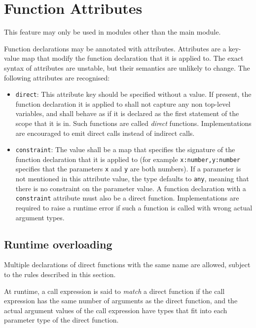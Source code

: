 \section{Function Attributes}

This feature may only be used in modules other than the main module.

Function declarations may be annotated with attributes.  Attributes are a key-value map that modify the function declaration that it is applied to.  The exact syntax of attributes are unstable, but their semantics are unlikely to change.  The following attributes are recognised:

\begin{itemize}

\item \lstinline{direct}:  This attribute key should be specified without a value.  If present, the function declaration it is applied to shall not capture any non top-level variables, and shall behave as if it is declared as the first statement of the scope that it is in.  Such functions are called \textit{direct} functions.  Implementations are encouraged to emit direct calls instead of indirect calls.

\item \lstinline{constraint}:  The value shall be a map that specifies the signature of the function declaration that it is applied to (for example \lstinline{x:number,y:number} specifies that the parameters \lstinline{x} and \lstinline{y} are both numbers).  If a parameter is not mentioned in this attribute value, the type defaults to \lstinline{any}, meaning that there is no constraint on the parameter value.  A function declaration with a \lstinline{constraint} attribute must also be a direct function.  Implementations are required to raise a runtime error if such a function is called with wrong actual argument types.

\end{itemize}

\subsection*{Runtime overloading}

Multiple declarations of direct functions with the same name are allowed, subject to the rules described in this section.

At runtime, a call expression is said to \textit{match} a direct function if the call expression has the same number of arguments as the direct function, and the actual argument values of the call expression have types that fit into each parameter type of the direct function.

